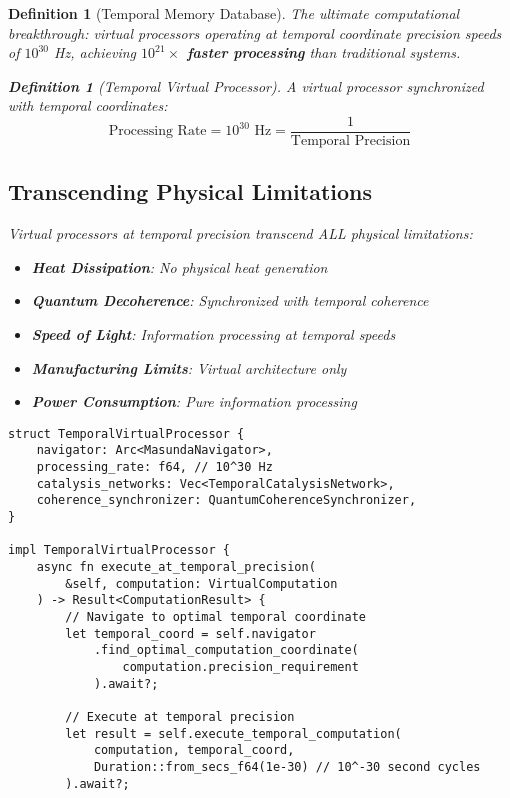 \documentclass[12pt]{article}
\newtheorem{definition}[theorem]{Definition}
\begin{document}
\begin{definition}[Temporal Memory Database]
The ultimate computational breakthrough: virtual processors operating at temporal coordinate precision speeds of $10^{30}$ Hz, achieving \textbf{$10^{21} \times$ faster processing} than traditional systems.

\begin{definition}[Temporal Virtual Processor]
A virtual processor synchronized with temporal coordinates:
\begin{equation}
\text{Processing Rate} = 10^{30} \text{ Hz} = \frac{1}{\text{Temporal Precision}}
\end{equation}
\end{definition}

\subsection{Transcending Physical Limitations}

Virtual processors at temporal precision transcend ALL physical limitations:
\begin{itemize}
    \item \textbf{Heat Dissipation}: No physical heat generation
    \item \textbf{Quantum Decoherence}: Synchronized with temporal coherence
    \item \textbf{Speed of Light}: Information processing at temporal speeds
    \item \textbf{Manufacturing Limits}: Virtual architecture only
    \item \textbf{Power Consumption}: Pure information processing
\end{itemize}

\begin{lstlisting}[caption=Temporal Virtual Processor Implementation]
struct TemporalVirtualProcessor {
    navigator: Arc<MasundaNavigator>,
    processing_rate: f64, // 10^30 Hz
    catalysis_networks: Vec<TemporalCatalysisNetwork>,
    coherence_synchronizer: QuantumCoherenceSynchronizer,
}

impl TemporalVirtualProcessor {
    async fn execute_at_temporal_precision(
        &self, computation: VirtualComputation
    ) -> Result<ComputationResult> {
        // Navigate to optimal temporal coordinate
        let temporal_coord = self.navigator
            .find_optimal_computation_coordinate(
                computation.precision_requirement
            ).await?;
        
        // Execute at temporal precision
        let result = self.execute_temporal_computation(
            computation, temporal_coord,
            Duration::from_secs_f64(1e-30) // 10^-30 second cycles
        ).await?;
        

\end{lstlisting}
\end{definition}
\end{document}
